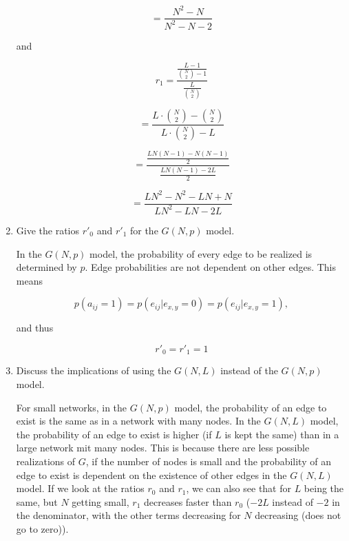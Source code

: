 \begin{enumerate}
	\begin{equation}
	= \frac{N^2 - N}{N^2 - N - 2}
	\end{equation}
	
	and 
	
	\begin{equation}
	r_1 = \frac{
					 \frac{L - 1}{\binom{N}{2} - 1}
					 }
					 {
					 \frac{L}{\binom{N}{2}}
					 }
	\end{equation}
	
	\begin{equation}
	= \frac{
			L \cdot \binom{N}{2} - \binom{N}{2}
		}
		{
			L \cdot \binom{N}{2} - L		
		}
	\end{equation}
	
	\begin{equation}
	= \frac{
			\frac{
				LN(N - 1) - N(N - 1)
			}
			{
				2
			}		
		}
		{
			\frac{
				LN(N - 1) - 2L
			}
			{
				2
			}	
		}
	\end{equation}
	
	\begin{equation}
	= \frac{
			LN^2 - N^2 - LN + N
		}{
			LN^2 - LN - 2L
		}
	\end{equation}
	
	\item Give the ratios $r'_0$ and $r'_1$ for the $G(N,p)$ model.
	
	In the $G(N,p)$ model, the probability of every edge to be realized is determined by $p$. Edge probabilities are not dependent on other edges. This means
	
	\begin{equation}
		p(a_{ij} = 1) = p(e_{ij}|e_{x,y}=0) = p(e_{ij}|e_{x,y}=1),
	\end{equation}
	
	and thus
	
	\begin{equation}
		r'_0 = r'_1 = 1
	\end{equation}
	
	\item Discuss the implications of using the $G(N,L)$ instead of the $G(N,p)$ model. 
	
	For small networks, in the $G(N, p)$ model, the probability of an edge to exist is the same as in a network with many nodes. In the $G(N, L)$ model, the probability of an edge to exist is higher (if $L$ is kept the same) than in a large network mit many nodes.  This is because there are less possible realizations of $G$, if the number of nodes is small and the probability of an edge to exist is dependent on the existence of other edges in the $G(N,L)$ model.  If we look at the ratios $r_0$ and $r_1$, we can also see that for $L$ being the same, but $N$ getting small, $r_1$ decreases faster than $r_0$ ($-2L$ instead of $-2$ in the denominator, with the other terms decreasing for $N$ decreasing (does not go to zero)).
\end{enumerate}